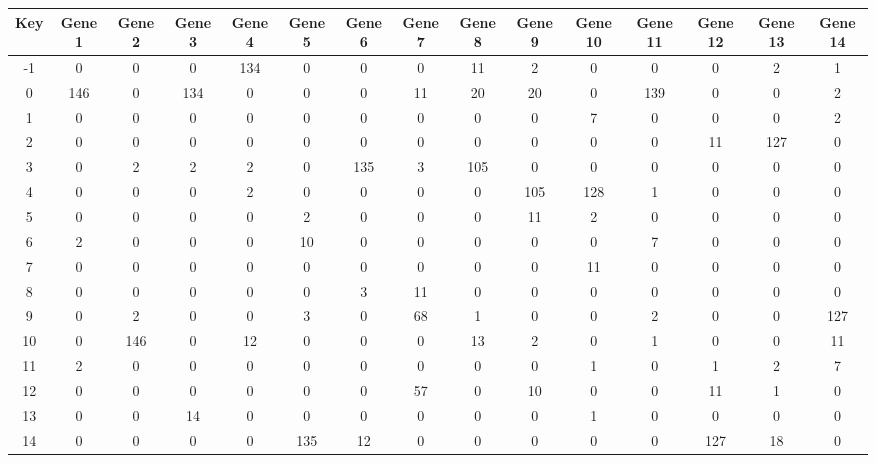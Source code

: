 \begin{tabular}{|c|c|c|c|c|c|c|c|c|c|c|c|c|c|c|}
\hline
Key & Gene 1 & Gene 2 & Gene 3 & Gene 4 & Gene 5 & Gene 6 & Gene 7 & Gene 8 & Gene 9 & Gene 10 & Gene 11 & Gene 12 & Gene 13 & Gene 14 \\
\hline
-1 & 0 & 0 & 0 & 134 & 0 & 0 & 0 & 11 & 2 & 0 & 0 & 0 & 2 & 1 \\
0 & 146 & 0 & 134 & 0 & 0 & 0 & 11 & 20 & 20 & 0 & 139 & 0 & 0 & 2 \\
1 & 0 & 0 & 0 & 0 & 0 & 0 & 0 & 0 & 0 & 7 & 0 & 0 & 0 & 2 \\
2 & 0 & 0 & 0 & 0 & 0 & 0 & 0 & 0 & 0 & 0 & 0 & 11 & 127 & 0 \\
3 & 0 & 2 & 2 & 2 & 0 & 135 & 3 & 105 & 0 & 0 & 0 & 0 & 0 & 0 \\
4 & 0 & 0 & 0 & 2 & 0 & 0 & 0 & 0 & 105 & 128 & 1 & 0 & 0 & 0 \\
5 & 0 & 0 & 0 & 0 & 2 & 0 & 0 & 0 & 11 & 2 & 0 & 0 & 0 & 0 \\
6 & 2 & 0 & 0 & 0 & 10 & 0 & 0 & 0 & 0 & 0 & 7 & 0 & 0 & 0 \\
7 & 0 & 0 & 0 & 0 & 0 & 0 & 0 & 0 & 0 & 11 & 0 & 0 & 0 & 0 \\
8 & 0 & 0 & 0 & 0 & 0 & 3 & 11 & 0 & 0 & 0 & 0 & 0 & 0 & 0 \\
9 & 0 & 2 & 0 & 0 & 3 & 0 & 68 & 1 & 0 & 0 & 2 & 0 & 0 & 127 \\
10 & 0 & 146 & 0 & 12 & 0 & 0 & 0 & 13 & 2 & 0 & 1 & 0 & 0 & 11 \\
11 & 2 & 0 & 0 & 0 & 0 & 0 & 0 & 0 & 0 & 1 & 0 & 1 & 2 & 7 \\
12 & 0 & 0 & 0 & 0 & 0 & 0 & 57 & 0 & 10 & 0 & 0 & 11 & 1 & 0 \\
13 & 0 & 0 & 14 & 0 & 0 & 0 & 0 & 0 & 0 & 1 & 0 & 0 & 0 & 0 \\
14 & 0 & 0 & 0 & 0 & 135 & 12 & 0 & 0 & 0 & 0 & 0 & 127 & 18 & 0 \\
\hline
\end{tabular}